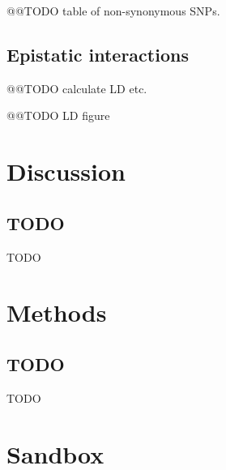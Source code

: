 \documentclass[a4paper,11pt,abstracton,hidelinks]{scrartcl}
\begin{document}
@@TODO table of non-synonymous SNPs.


\subsection*{Epistatic interactions}


@@TODO calculate LD etc.


@@TODO LD figure


\section*{Discussion}


\subsection*{TODO}


TODO


\section*{Methods}


\subsection*{TODO}

TODO


\section*{Sandbox}
\end{document}
